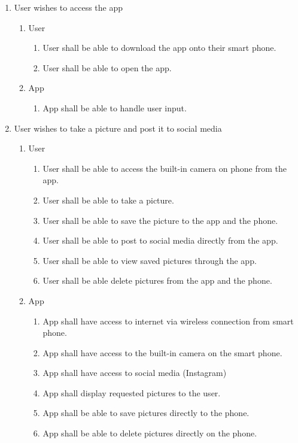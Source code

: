 \documentclass[]{article}
\begin{document}
\begin{enumerate}[{BE}1.]
	\item User wishes to access the app
	\begin{enumerate}[{VP1}.1]
		\item User
			\begin{enumerate}
				\item User shall be able to download the app onto their smart phone.
				\item User shall be able to open the app.
			\end{enumerate}
		\item App
			\begin{enumerate}
				\item App shall be able to handle user input.
			\end{enumerate}
	\end{enumerate}
	\item User wishes to take a picture and post it to social media
	\begin{enumerate}[{VP2}.1]
		\item User
			\begin{enumerate}
				\item User shall be able to access the built-in camera on phone from the app.
				\item User shall be able to take a picture.
				\item User shall be able to save the picture to the app and the phone.
				\item User shall be able to post to social media directly from the app.
				\item User shall be able to view saved pictures through the app.
				\item User shall be able delete pictures from the app and the phone.
			\end{enumerate}
		\item App
			\begin{enumerate}
				\item App shall have access to internet via wireless connection from smart phone.
				\item App shall have access to the built-in camera on the smart phone.
				\item App shall have access to social media (Instagram)
				\item App shall display requested pictures to the user.
				\item App shall be able to save pictures directly to the phone.
				\item App shall be able to delete pictures directly on the phone.
			\end{enumerate}
	\end{enumerate}
\end{enumerate}
\end{document}
